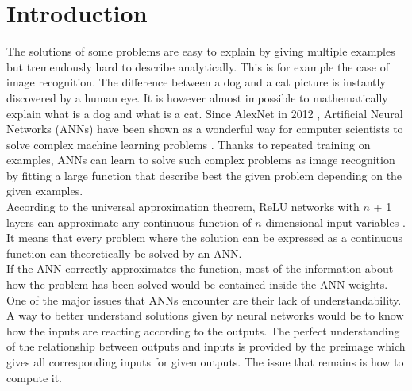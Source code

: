 \documentclass{article}
\begin{document}
\section{Introduction}
The solutions of some problems are easy to explain by giving multiple examples but tremendously hard to describe analytically. 
This is for example the case of image recognition. The difference between a dog and a cat picture is instantly discovered by a human eye. 
It is however almost impossible to mathematically explain what is a dog and what is a cat. Since AlexNet in 2012 \cite{krizhevsky2012imagenet}, 
Artificial Neural Networks (ANNs) have been shown as a wonderful way for computer scientists to solve complex machine learning problems \cite{sejnowski2020unreasonable}. 
Thanks to repeated training on examples, ANNs can learn to solve such complex problems as image recognition by fitting a large function 
that describe best the given problem depending on the given examples.\\
According to the universal approximation theorem, ReLU networks with $n$ + 1 layers can approximate any continuous function of 
$n$-dimensional input variables \cite{hanin2017approximating}. It means that every problem where the solution can be expressed as a continuous function can 
theoretically be  solved by an ANN. \\
If the ANN correctly approximates the function, most of the information about how the problem has been solved would be contained 
inside the ANN weights. One of the major issues that ANNs encounter are their lack of understandability. 
A way to better understand solutions given by neural networks would be to know how the inputs are reacting according to the outputs. 
The perfect understanding of the relationship between outputs and inputs is provided by the preimage which gives all corresponding 
inputs for given outputs. The issue that remains is how to compute it. \\\\
\end{document}
